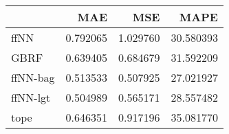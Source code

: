 \begin{tabular}{lrrr}
\toprule
{} &       MAE &       MSE &       MAPE \\
\midrule
ffNN     &  0.792065 &  1.029760 &  30.580393 \\
GBRF     &  0.639405 &  0.684679 &  31.592209 \\
ffNN-bag &  0.513533 &  0.507925 &  27.021927 \\
ffNN-lgt &  0.504989 &  0.565171 &  28.557482 \\
tope     &  0.646351 &  0.917196 &  35.081770 \\
\bottomrule
\end{tabular}
